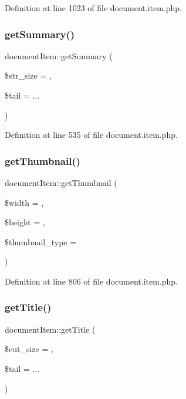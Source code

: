 Definition at line 1023 of file document.\+item.\+php.

\hypertarget{classdocumentItem_a3c14c5f51f4784b92b78d58f8240f75f}{}\label{classdocumentItem_a3c14c5f51f4784b92b78d58f8240f75f} 
\subsubsection{\texorpdfstring{get\+Summary()}{getSummary()}}
{\footnotesize\ttfamily document\+Item\+::get\+Summary (\begin{DoxyParamCaption}\item[{}]{\$str\+\_\+size = {},  }\item[{}]{\$tail = {\ttfamily \textquotesingle{}...\textquotesingle{}} }\end{DoxyParamCaption})}



Definition at line 535 of file document.\+item.\+php.

\hypertarget{classdocumentItem_ac45108459a38d6780d8575e892e0b85b}{}\label{classdocumentItem_ac45108459a38d6780d8575e892e0b85b} 
\subsubsection{\texorpdfstring{get\+Thumbnail()}{getThumbnail()}}
{\footnotesize\ttfamily document\+Item\+::get\+Thumbnail (\begin{DoxyParamCaption}\item[{}]{\$width = {},  }\item[{}]{\$height = {},  }\item[{}]{\$thumbnail\+\_\+type = {\ttfamily \textquotesingle{}\textquotesingle{}} }\end{DoxyParamCaption})}



Definition at line 806 of file document.\+item.\+php.

\hypertarget{classdocumentItem_a365509266cc36e56b66df824bc2fcbfc}{}\label{classdocumentItem_a365509266cc36e56b66df824bc2fcbfc} 
\subsubsection{\texorpdfstring{get\+Title()}{getTitle()}}
{\footnotesize\ttfamily document\+Item\+::get\+Title (\begin{DoxyParamCaption}\item[{}]{\$cut\+\_\+size = {},  }\item[{}]{\$tail = {\ttfamily \textquotesingle{}...\textquotesingle{}} }\end{DoxyParamCaption})}



